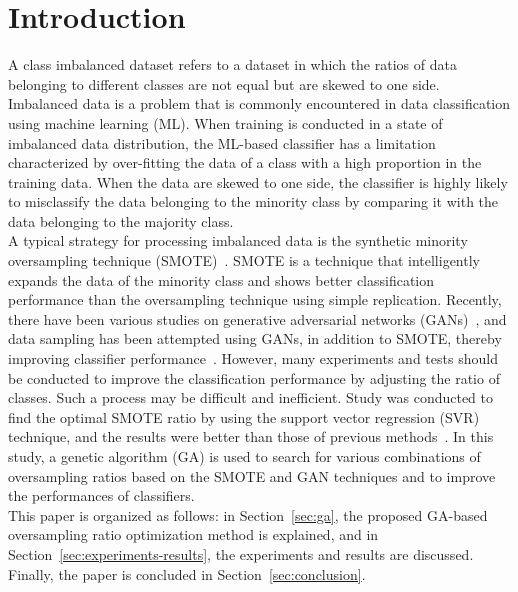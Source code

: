 \section{Introduction}
\label{sec:introduction}
A class imbalanced dataset refers to a dataset in which the ratios of data belonging to different classes are not equal but are skewed to one side.
Imbalanced data is a problem that is commonly encountered in data classification using machine learning (ML).
When training is conducted in a state of imbalanced data distribution, the ML-based classifier has a limitation characterized by over-fitting the data of a class with a high proportion in the training data.
When the data are skewed to one side, the classifier is highly likely to misclassify the data belonging to the minority class by comparing it with the data belonging to the majority class.\\
A typical strategy for processing imbalanced data is the synthetic minority oversampling technique (SMOTE)~\cite{DBLP:journals/jair/ChawlaBHK02}.
SMOTE is a technique that intelligently expands the data of the minority class and shows better classification performance than the oversampling technique using simple replication.
Recently, there have been various studies on generative adversarial networks (GANs)~\cite{DBLP:conf/gecco/ChoK19}, and data sampling has been attempted using GANs, in addition to SMOTE, thereby improving classifier performance~\cite{DBLP:conf/iciss/GangwarR19}.
However, many experiments and tests should be conducted to improve the classification performance by adjusting the ratio of classes.
Such a process may be difficult and inefficient.
Study was conducted to find the optimal SMOTE ratio by using the support vector regression (SVR) technique, and the results were better than those of previous methods~\cite{DBLP:journals/cin/SeoK18}.
In this study, a genetic algorithm (GA) is used to search for various combinations of oversampling ratios based on the SMOTE and GAN techniques and to improve the performances of classifiers.\\
This paper is organized as follows: in Section~\ref{sec:ga}, the proposed GA-based oversampling ratio optimization method is explained, and in Section~\ref{sec:experiments-results}, the experiments and results are discussed. Finally, the paper is concluded in Section~\ref{sec:conclusion}.


